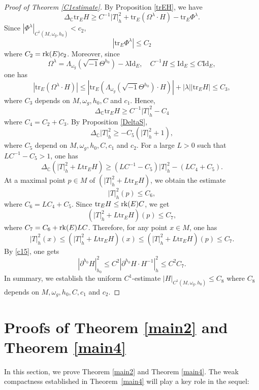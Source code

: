\documentclass[12pt, reqno]{amsart}
\newcommand{\rk}{{\rm rk}}
\theoremstyle{plain}
\theoremstyle{definition}
\newcommand{\bproof}{\begin{proof}}
\newcommand{\eproof}{\end{proof}}
\newcommand{\sq}{\sqrt{-1}}
\newcommand{\p}{\partial}
\newcommand{\beq}{\begin{equation}}
\newcommand{\eeq}{\end{equation}}
\newcommand{\Om}{\Omega}
\renewcommand{\>}{\rightarrow}
\newcommand{\C}{{\mathbb C}}
\renewcommand{\>}{\rightarrow}
\renewcommand{\p}{{\partial}}
\newcommand{\tr}{\mathrm{tr}}
\numberwithin{equation}{section} %
\begin{document}
\bproof[Proof of Theorem \ref{C1estimate}] By Proposition \ref{trEH}, we have
\beq \Delta_{\C}\mathrm{tr}_E H  \geq  C^{-1}|T|^2_h+\tr_E(\Om^{\lambda}\cdot H) -\mathrm{tr}_E\Phi^{\lambda}. \eeq
Since $|\Phi^\lambda|_{C^1(M,\omega_g, h_0)}<c_2$,
\beq |\mathrm{tr}_E\Phi^{\lambda} |\leq C_2\eeq 
where $C_2=\rk(E) c_2$.  Moreover, since $$\Omega^\lambda= \Lambda_{\omega_g}\left(\sq \Theta^{h_0}\right) - \lambda\mathrm{Id}_E, \quad C^{-1}H\leq \mathrm{Id}_E\leq C\mathrm{Id}_E, $$ one has 
\beq |\tr_E(\Om^{\lambda}\cdot H)|\leq \left|\tr_E\left(\Lambda_{\omega_g}\left(\sq \Theta^{h_0}\right)\cdot H\right)\right| +|\lambda||\tr_EH|  \leq C_3, \eeq 
where $C_3$ depends on $M,\omega_g, h_0, C$ and $c_1$. Hence, 
\beq \Delta_{\C}\mathrm{tr}_E H  \geq  C^{-1}|T|^2_h-C_4 \eeq
where $C_4=C_2+C_3$. By Proposition \ref{DeltaS},
\beq \Delta_{\C} |T|_h^2 \geq -C_{5}(|T|_h^2 + 1), \eeq
where  $C_5$ depend on $M,\omega_g,  h_0, C, c_1 $ and $c_2$. For a large $ L > 0 $ such that $LC^{-1} - C_{5}>1$, one has
\beq \Delta_{\C} (|T|_h^2 + L\mathrm{tr}_E H) \geq (LC^{-1} - C_{5})|T|_h^2 - (LC_4+C_5). \eeq
At a maximal point $ p \in M $ of $ (|T|_h^2 + L\mathrm{tr}_E H) $,  we obtain the estimate
\beq |T|_h^2(p)  \leq C_{6}, \eeq
where $C_6=LC_4+C_5$.
Since $\mathrm{tr}_EH \leq \rk(E) C$, we get
\beq (|T|_h^2 + L\mathrm{tr}_E H)(p) \leq  C_{7}, \eeq
where $C_7=C_6+\rk(E) LC$.
Therefore, for any point $ x \in M $, one has
\beq |T|^2_h(x) \leq (|T|_h^2 + L\mathrm{tr}_E H)(x)\leq (|T|_h^2 + L\mathrm{tr}_E H)(p) \leq C_{7}. \eeq
By \eqref{c15}, one gets
\beq |\p^{h_0} H|_{h_0}^2 \leq C^2|\p^{h_0}H \cdot H^{-1}  |^2_h \leq  C^2 C_{7}. \eeq
In summary, we establish the uniform $C^1$-estimate
$|H|_{C^1(M,\omega_g, h_0)}\leq C_{8}$ where $ C_{8}$  depends on $M,\omega_g,h_0,  C, c_1$ and $c_2$.
\eproof


\baselineskip

\section{Proofs of Theorem \ref{main2} and Theorem \ref{main4}}
In this section, we prove Theorem \ref{main2} and Theorem \ref{main4}. The weak compactness established in Theorem~\ref{main4} will play a key role in the sequel:
\end{document}
